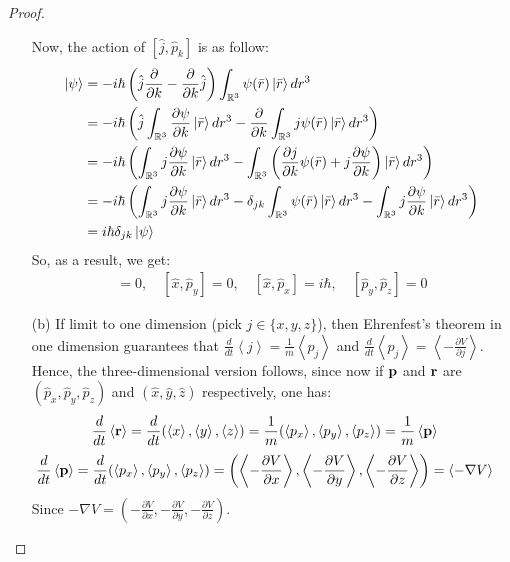 \documentclass{article}
\begin{document}
\begin{proof}
\begin{itemize}
        Now, the action of $[\hat{j}, \hat{p}_k]$ is as follow:
        \begin{align}
            [\hat{j},\hat{p}_k]\ket{\psi} &= -i\hbar\left(\hat{j}\frac{\partial}{\partial k}-\frac{\partial}{\partial k}\hat{j}\right)\int_{\RR^3}\psi(\bar{r})\ket{\bar{r}}dr^3\\
            &= -i\hbar\left(\hat{j}\int_{\RR^3}\frac{\partial\psi}{\partial k}\ket{\bar{r}}dr^3 - \frac{\partial}{\partial k}\int_{\RR^3}j\psi(\bar{r})\ket{\bar{r}}dr^3\right)\\
            &= -i\hbar\left(\int_{\RR^3}j\frac{\partial\psi}{\partial k}\ket{\bar{r}}dr^3 - \int_{\RR^3}\left(\frac{\partial j}{\partial k}\psi(\bar{r}) + j \frac{\partial \psi}{\partial k}\right)\ket{\bar{r}}dr^3\right)\\
            &= -i\hbar\left(\int_{\RR^3}j\frac{\partial\psi}{\partial k}\ket{\bar{r}}dr^3  - \delta_{j k}\int_{\RR^3}\psi(\bar{r})\ket{\bar{r}}dr^3 - \int_{\RR^3}j\frac{\partial\psi}{\partial k}\ket{\bar{r}}dr^3\right)\\
            &= i\hbar \delta_{j k}\ket{\psi}
        \end{align}
        So, as a result, we get:
        \begin{align}
            [\hat{x},\hat{y}] = 0,\quad [\hat{x},\hat{p}_y] = 0,\quad [\hat{x},\hat{p}_x] = i\hbar,\quad [\hat{p}_y,\hat{p}_z] = 0
        \end{align}

        \hfil

        \item[(b)] If limit to one dimension (pick $j\in\{x,y,z\}$), then Ehrenfest's theorem in one dimension guarantees that $\frac{d}{dt}\left<j\right> = \frac{1}{m}\left<p_j\right>$ and $\frac{d}{dt}\left<p_j\right> = \left<-\frac{\partial V}{\partial j}\right>$. Hence, the three-dimensional version follows, since now if $\mathbf{p}$ and $\mathbf{r}$ are $(\hat{p}_x,\hat{p}_y,\hat{p}_z)$ and $(\hat{x},\hat{y},\hat{z})$ respectively, one has:
        \begin{align}
            \frac{d}{dt}\left<\mathbf{r}\right> &= \frac{d}{dt}(\left<x\right>,\left<y\right>,\left<z\right>) = \frac{1}{m}(\left<p_x\right>,\left<p_y\right>,\left<p_z\right>) = \frac{1}{m}\left<\mathbf{p}\right>
        \end{align}
        \begin{align}
            \frac{d}{dt}\left<\mathbf{p}\right> &= \frac{d}{dt}(\left<p_x\right>,\left<p_y\right>,\left<p_z\right>) = \left(\left<-\frac{\partial V}{\partial x}\right>, \left<-\frac{\partial V}{\partial y}\right>, \left<-\frac{\partial V}{\partial z}\right>\right) = \left<-\nabla V\right>
        \end{align}
        Since $-\nabla V = \left(-\frac{\partial V}{\partial x},-\frac{\partial V}{\partial y},-\frac{\partial V}{\partial z}\right)$.


\end{itemize}
\end{proof}
\end{document}
